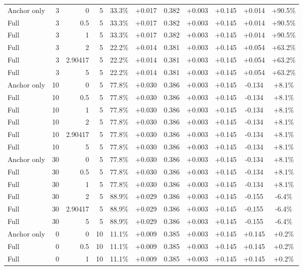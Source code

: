 \begin{table}[htbp]
\begin{tabular}{lrrrccccccc}
Anchor only & 3 & 0 & 5 & 33.3\% & +0.017 & 0.382 & +0.003 & +0.145 & +0.014 & +90.5\% \\
Full & 3 & 0.5 & 5 & 33.3\% & +0.017 & 0.382 & +0.003 & +0.145 & +0.014 & +90.5\% \\
Full & 3 & 1 & 5 & 33.3\% & +0.017 & 0.382 & +0.003 & +0.145 & +0.014 & +90.5\% \\
Full & 3 & 2 & 5 & 22.2\% & +0.014 & 0.381 & +0.003 & +0.145 & +0.054 & +63.2\% \\
Full & 3 & 2.90417 & 5 & 22.2\% & +0.014 & 0.381 & +0.003 & +0.145 & +0.054 & +63.2\% \\
Full & 3 & 5 & 5 & 22.2\% & +0.014 & 0.381 & +0.003 & +0.145 & +0.054 & +63.2\% \\
Anchor only & 10 & 0 & 5 & 77.8\% & +0.030 & 0.386 & +0.003 & +0.145 & -0.134 & +8.1\% \\
Full & 10 & 0.5 & 5 & 77.8\% & +0.030 & 0.386 & +0.003 & +0.145 & -0.134 & +8.1\% \\
Full & 10 & 1 & 5 & 77.8\% & +0.030 & 0.386 & +0.003 & +0.145 & -0.134 & +8.1\% \\
Full & 10 & 2 & 5 & 77.8\% & +0.030 & 0.386 & +0.003 & +0.145 & -0.134 & +8.1\% \\
Full & 10 & 2.90417 & 5 & 77.8\% & +0.030 & 0.386 & +0.003 & +0.145 & -0.134 & +8.1\% \\
Full & 10 & 5 & 5 & 77.8\% & +0.030 & 0.386 & +0.003 & +0.145 & -0.134 & +8.1\% \\
Anchor only & 30 & 0 & 5 & 77.8\% & +0.030 & 0.386 & +0.003 & +0.145 & -0.134 & +8.1\% \\
Full & 30 & 0.5 & 5 & 77.8\% & +0.030 & 0.386 & +0.003 & +0.145 & -0.134 & +8.1\% \\
Full & 30 & 1 & 5 & 77.8\% & +0.030 & 0.386 & +0.003 & +0.145 & -0.134 & +8.1\% \\
Full & 30 & 2 & 5 & 88.9\% & +0.029 & 0.386 & +0.003 & +0.145 & -0.155 & -6.4\% \\
Full & 30 & 2.90417 & 5 & 88.9\% & +0.029 & 0.386 & +0.003 & +0.145 & -0.155 & -6.4\% \\
Full & 30 & 5 & 5 & 88.9\% & +0.029 & 0.386 & +0.003 & +0.145 & -0.155 & -6.4\% \\
Anchor only & 0 & 0 & 10 & 11.1\% & +0.009 & 0.385 & +0.003 & +0.145 & +0.145 & +0.2\% \\
Full & 0 & 0.5 & 10 & 11.1\% & +0.009 & 0.385 & +0.003 & +0.145 & +0.145 & +0.2\% \\
Full & 0 & 1 & 10 & 11.1\% & +0.009 & 0.385 & +0.003 & +0.145 & +0.145 & +0.2\% \\

\end{tabular}
\end{table}
